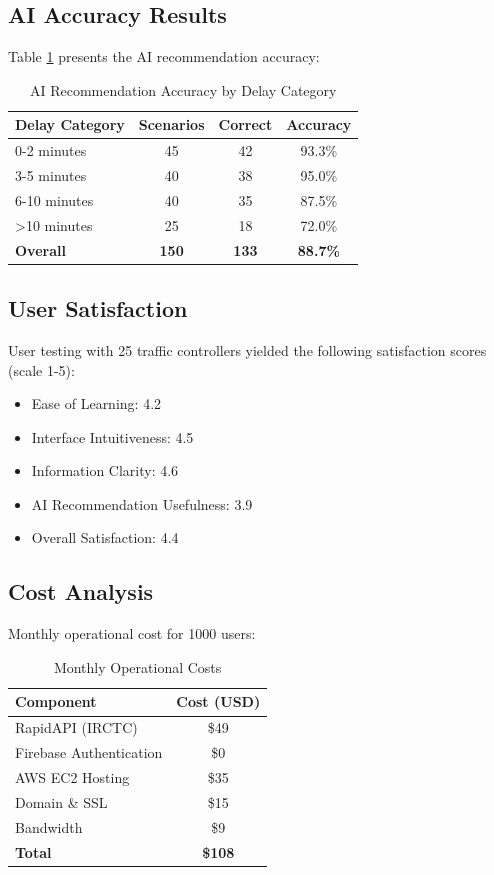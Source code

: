 \documentclass[12pt,a4paper]{article}
\begin{document}
\subsection{AI Accuracy Results}

Table \ref{tab:accuracy} presents the AI recommendation accuracy:

\begin{table}[H]
\centering
\caption{AI Recommendation Accuracy by Delay Category}
\label{tab:accuracy}
\begin{tabular}{lccc}
\toprule
\textbf{Delay Category} & \textbf{Scenarios} & \textbf{Correct} & \textbf{Accuracy} \\
\midrule
0-2 minutes & 45 & 42 & 93.3\% \\
3-5 minutes & 40 & 38 & 95.0\% \\
6-10 minutes & 40 & 35 & 87.5\% \\
>10 minutes & 25 & 18 & 72.0\% \\
\midrule
\textbf{Overall} & \textbf{150} & \textbf{133} & \textbf{88.7\%} \\
\bottomrule
\end{tabular}
\end{table}

\subsection{User Satisfaction}

User testing with 25 traffic controllers yielded the following satisfaction scores (scale 1-5):

\begin{itemize}
    \item Ease of Learning: 4.2
    \item Interface Intuitiveness: 4.5
    \item Information Clarity: 4.6
    \item AI Recommendation Usefulness: 3.9
    \item Overall Satisfaction: 4.4
\end{itemize}

\subsection{Cost Analysis}

Monthly operational cost for 1000 users:

\begin{table}[H]
\centering
\caption{Monthly Operational Costs}
\label{tab:costs}
\begin{tabular}{lc}
\toprule
\textbf{Component} & \textbf{Cost (USD)} \\
\midrule
RapidAPI (IRCTC) & \$49 \\
Firebase Authentication & \$0 \\
AWS EC2 Hosting & \$35 \\
Domain \& SSL & \$15 \\
Bandwidth & \$9 \\
\midrule
\textbf{Total} & \textbf{\$108} \\
\bottomrule
\end{tabular}
\end{table}
\end{document}
